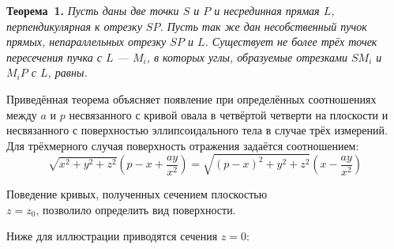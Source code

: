 \documentclass[a5paper,12pt,openbib]{report}
\begin{document}
\textbf{Теорема~1.} {\it Пусть даны две точки $S$ и $P$ и несрединная прямая $L$, перпендикулярная к отрезку $SP$. Пусть так же дан несобственный пучок прямых, непараллельных отрезку $SP$ и $L$. Существует не более трёх точек пересечения пучка с $L$ --- $M_i$, в которых углы, образуемые отрезками $SM_i$ и $M_iP$ с $L$, равны.}

Приведённая теорема объясняет появление при определённых соотношениях между $a$ и $p$ несвязанного с кривой овала в четвёртой четверти на плоскости и несвязанного с поверхностью эллипсоидального тела в случае трёх измерений. Для трёхмерного случая поверхность отражения задаётся соотношением:
\[
\sqrt{x^2+y^2+z^2} 
\left( p-x+ \frac{ay}{x^2} \right)
=
\sqrt{{(p-x)}^2+y^2+z^2} 
\left( x - \frac{ay}{x^2} \right)
\] 

Поведение кривых, полученных сечением плоскостью \\ 
$z=z_0$, позволило определить вид поверхности. 

Ниже для иллюстрации приводятся сечения $z=0$:
\end{document}
